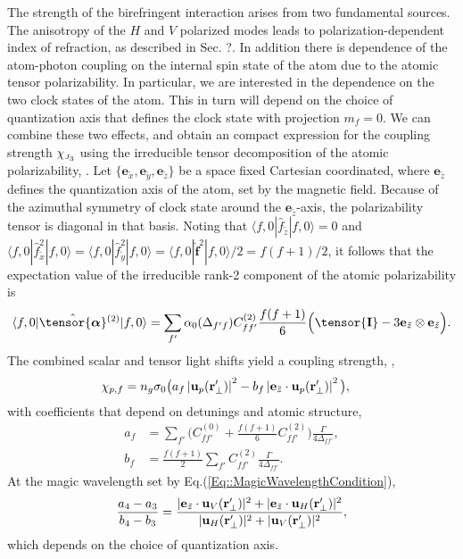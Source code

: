\documentclass[preprint, aps,pra,onecolumn]{revtex4-1} %
\newcommand{\unittens}{\tensor{\mathbf{I}}}
\newcommand{\poltens}{\hat{\tensor{\boldsymbol{\alpha}}}}
\newcommand{\charpol}{\alpha_0(\Delta_{f'f})}
\newcommand{\qaxis}{\mathbf{e}_{\tilde{z}}}
\newcommand{\chieff}{\chi_{\raisebox{-.1pt}{\tiny $J_3$}}}
\begin{document}
The strength of the birefringent interaction {\color{blue} arises from two fundamental sources.  The anisotropy of the   $H$ and $V$ polarized modes leads to polarization-dependent index of refraction, as described in Sec. ?.  In addition there is dependence of the atom-photon coupling on the internal spin state of the atom due to the atomic tensor polarizability.  In particular, we are interested in the dependence on the two clock states of the atom.  This in turn will depend on the choice of quantization axis that defines the clock state with projection $m_f=0$.  We can combine these two effects}, and obtain an compact expression for the coupling strength $\chieff$ using the irreducible tensor decomposition of the atomic polarizability, .  
Let {\color{blue} $\{\mathbf{e}_{\tilde{x}},\mathbf{e}_{\tilde{y}}, \mathbf{e}_{\tilde{z}}\}$ be a space fixed Cartesian coordinated, where $\mathbf{e}_{\tilde{z}}$ defines the quantization axis of the atom, set by the magnetic field}.  Because of the azimuthal symmetry of clock state around the $\qaxis$-axis, the polarizability tensor is diagonal in that basis.  
Noting that $\langle f,0 | \hat{f}_{\tilde{z}}| f,0 \rangle =0$ and $\langle f,0 | \hat{f}_{\tilde{x}}^2| f,0 \rangle = \langle f,0 | \hat{f}_{\tilde{y}}^2| f,0 \rangle = \langle f,0 | \hat{\mathbf{f}}^2| f,0 \rangle /2 =f(f+1)/2$, it follows that the expectation value of the irreducible rank-2 component of the atomic polarizability is
	\begin{align} \label{Eq::CouplingAngleMagic}
		\langle f,0 | \poltens \phantom{}^{(2)}| f,0 \rangle = \sum_{f'} \charpol C^{(2)}_{ff'} \frac{f(f+1)}{6} \Big( \unittens - 3\qaxis \otimes \qaxis \Big).
	\end{align}
The combined scalar and tensor light shifts yield a coupling strength, ,
	\begin{align}
		\chi_{p,f} &  = n_g \sigma_0 \big(  a_{f} \left|\mathbf{u}_p(\mathbf{r}'_\perp)\right|^2 - b_{f} \left|\mathbf{e}_{\tilde{z}} \cdot \mathbf{u}_p(\mathbf{r}'_\perp)\right|^2 \big), \label{Eq::ClockStateCoupling}
	\end{align}
with coefficients that depend on detunings and atomic structure,
	\begin{align}
		a_f &= \sum_{f'}  \Big(C^{(0)}_{ff'} + \frac{f(f+1)}{6} C^{(2)}_{ff'} \Big) \frac{\Gamma}{4 \Delta_{ff'}},\\
		b_f &= \frac{f(f+1)}{2}\sum_{f'} C^{(2)}_{ff'}  \frac{\Gamma}{4 \Delta_{ff'}}.
	\end{align}
At the magic wavelength set by Eq.(\ref{Eq::MagicWavelengthCondition}),
\begin{equation}
	\frac{a_4-a_3}{b_4-b_3} =  \frac{ |\mathbf{e}_{\tilde{z}} \cdot \mathbf{u}_V(\mathbf{r}'_\perp)|^2  + |\mathbf{e}_{\tilde{z}} \cdot \mathbf{u}_H(\mathbf{r}'_\perp) |^2 }{ |\mathbf{u}_H(\mathbf{r}'_\perp)|^2 + |\mathbf{u}_V(\mathbf{r}'_\perp)|^2 },
\end{equation}
which depends on the choice of quantization axis.
\end{document}
